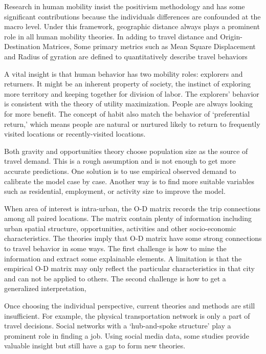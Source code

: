 \documentclass[
  11pt,
  openany]{memoir}
\begin{document}
Research in human mobility insist the positivism methodology and has some significant contributions because the individuals differences are confounded at the macro level. Under this framework, geographic distance always plays a prominent role in all human mobility theories. In adding to travel distance and Origin-Destination Matrices, Some primary metrics such as Mean Square Displacement and Radius of gyration are defined to quantitatively describe travel behaviors

A vital insight is that human behavior has two mobility roles: explorers and returners. It might be an inherent property of society, the instinct of exploring more territory and keeping together for division of labor. The explorers' behavior is consistent with the theory of utility maximization. People are always looking for more benefit. The concept of habit also match the behavior of `preferential return,' which means people are natural or nurtured likely to return to frequently visited locations or recently-visited locations.

Both gravity and opportunities theory choose population size as the source of travel demand. This is a rough assumption and is not enough to get more accurate predictions. One solution is to use empirical observed demand to calibrate the model case by case. Another way is to find more suitable variables such as residential, employment, or activity size to improve the model.

When area of interest is intra-urban, the O-D matrix records the trip connections among all paired locations. The matrix contain plenty of information including urban spatial structure, opportunities, activities and other socio-economic characteristics. The theories imply that O-D matrix have some strong connections to travel behavior in some ways. The first challenge is how to mine the information and extract some explainable elements. A limitation is that the empirical O-D matrix may only reflect the particular characteristics in that city and can not be applied to others. The second challenge is how to get a generalized interpretation,

Once choosing the individual perspective, current theories and methods are still insufficient. For example, the physical transportation network is only a part of travel decisions. Social networks with a `hub-and-spoke structure' play a prominent role in finding a job. Using social media data, some studies provide valuable insight but still have a gap to form new theories.
\end{document}
